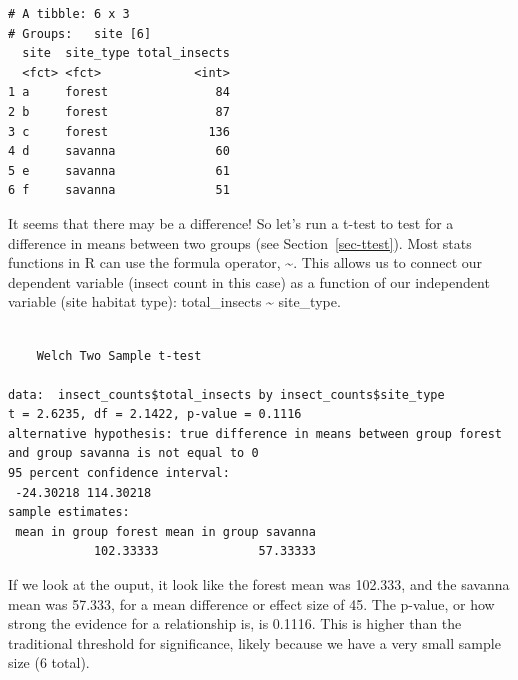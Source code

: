 \documentclass[
  letterpaper,
  DIV=11,
  numbers=noendperiod]{scrreprt}
\newenvironment{Shaded}{\begin{snugshade}}{\end{snugshade}}
\newcommand{\AttributeTok}[1]{\textcolor[rgb]{0.40,0.45,0.13}{#1}}
\newcommand{\DocumentationTok}[1]{\textcolor[rgb]{0.37,0.37,0.37}{\textit{#1}}}
\newcommand{\FunctionTok}[1]{\textcolor[rgb]{0.28,0.35,0.67}{#1}}
\newcommand{\NormalTok}[1]{\textcolor[rgb]{0.00,0.23,0.31}{#1}}
\newcommand{\OtherTok}[1]{\textcolor[rgb]{0.00,0.23,0.31}{#1}}
\newcommand{\SpecialCharTok}[1]{\textcolor[rgb]{0.37,0.37,0.37}{#1}}
\begin{document}
\begin{verbatim}
# A tibble: 6 x 3
# Groups:   site [6]
  site  site_type total_insects
  <fct> <fct>             <int>
1 a     forest               84
2 b     forest               87
3 c     forest              136
4 d     savanna              60
5 e     savanna              61
6 f     savanna              51
\end{verbatim}

It seems that there may be a difference! So let's run a t-test to test
for a difference in means between two groups (see
Section~\ref{sec-ttest}). Most stats functions in R can use the formula
operator, \textasciitilde. This allows us to connect our dependent
variable (insect count in this case) as a function of our independent
variable (site habitat type): total\_insects \textasciitilde{}
site\_type.

\begin{Shaded}
\end{Shaded}

\begin{verbatim}

    Welch Two Sample t-test

data:  insect_counts$total_insects by insect_counts$site_type
t = 2.6235, df = 2.1422, p-value = 0.1116
alternative hypothesis: true difference in means between group forest and group savanna is not equal to 0
95 percent confidence interval:
 -24.30218 114.30218
sample estimates:
 mean in group forest mean in group savanna 
            102.33333              57.33333 
\end{verbatim}

If we look at the ouput, it look like the forest mean was 102.333, and
the savanna mean was 57.333, for a mean difference or effect size of 45.
The p-value, or how strong the evidence for a relationship is, is
0.1116. This is higher than the traditional threshold for significance,
likely because we have a very small sample size (6 total).
\end{document}
